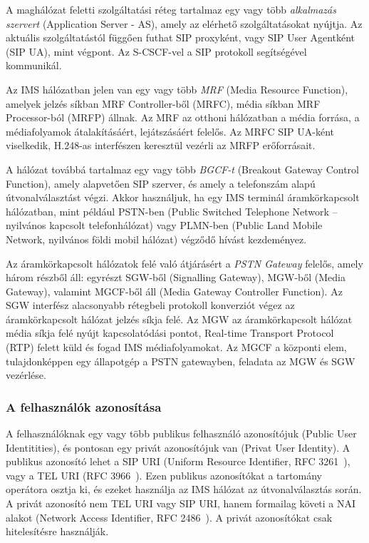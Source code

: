 A maghálózat feletti szolgáltatási réteg tartalmaz egy vagy több \emph{alkalmazás szer\-vert} (Application Server - AS), amely az elérhető szolgáltatásokat nyújtja. Az aktuális szolgáltatástól függően futhat SIP proxyként, vagy SIP User Agentként (SIP UA), mint végpont. Az S-CSCF-vel a SIP protokoll segítségével kommunikál.

Az IMS hálózatban jelen van egy vagy több \emph{MRF} (Media Resource Function), amelyek jelzés síkban MRF Controller-ből (MRFC), média síkban MRF Processor-ból (MRFP) állnak.  Az MRF az otthoni hálózatban a média forrása, a médiafolyamok átalakításáért, lejátszásáért felelős. Az MRFC SIP UA-ként viselkedik, H.248-as interfészen keresztül vezérli az MRFP erőforrásait.

A hálózat továbbá tartalmaz egy vagy több \emph{BGCF-t} (Breakout Gateway Control Function), amely alapvetően SIP szerver, és amely a telefonszám alapú út\-vo\-nal\-vá\-lasz\-tást végzi. Akkor használjuk, ha egy IMS terminál áramkörkapcsolt hálózatban, mint például PSTN-ben (Public Switched Telephone Network – nyilvános kapcsolt telefonhálózat) vagy PLMN-ben (Public Land Mobile Network, nyilvános földi mobil hálózat) végződő hívást kezdeményez.

Az áramkörkapcsolt hálózatok felé való átjárásért a \emph{PSTN Gateway} felelős, a\-mely három részből áll: egyrészt SGW-ből (Signalling Gateway), MGW-ből (Media Gateway), valamint MGCF-ből áll (Media Gateway Controller Function). Az SGW interfész alacsonyabb rétegbeli protokoll konverziót végez az áramkörkapcsolt hálózat jelzés síkja felé. Az MGW az áramkörkapcsolt hálózat média síkja felé nyújt kapcsolatódási pontot, Real-time Transport Protocol (RTP) felett küld és fogad IMS médiafolyamokat. Az MGCF a központi elem, tulajdonképpen egy állapotgép a PSTN gatewayben, feladata az MGW és SGW vezérlése.

\subsubsection{A felhasználók azonosítása}

A felhasználóknak egy vagy több publikus felhasználó azonosítójuk (Public User Identitities), és pontosan egy privát azonosítójuk van (Privat User Identity). A publikus azonosító lehet a SIP URI (Uniform Resource Identifier, RFC 3261~\cite{rfc3261}), vagy a TEL URI (RFC 3966~\cite{rfc3966}). Ezen publikus azonosítókat a tartomány operátora osztja ki, és ezeket használja az IMS hálózat az útvonalválasztás során. A privát azonosító nem TEL URI vagy SIP URI, hanem formailag követi a NAI alakot (Network Access Identifier, RFC 2486~\cite{rfc2486}). A privát azonosítókat csak hitelesítésre használják.

